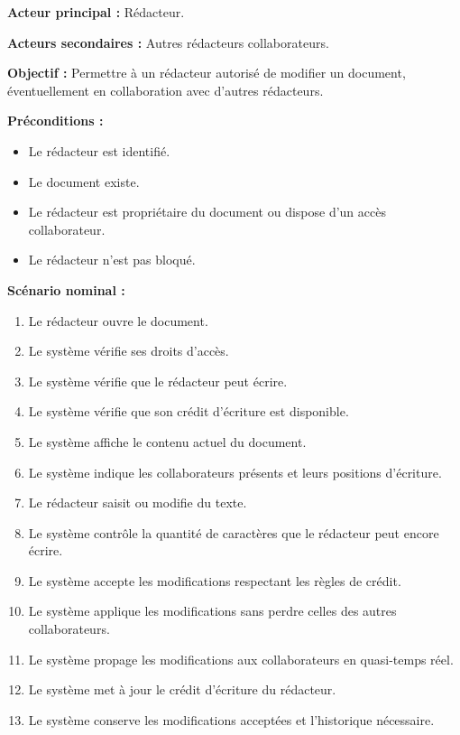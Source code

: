 \begin{description}[leftmargin=0pt, style=nextline, font=\normalfont\bfseries\color{violetprincipal}]
    \item[UC04 --- Modifier un document]

    \textbf{Acteur principal :} Rédacteur.

    \textbf{Acteurs secondaires :} Autres rédacteurs collaborateurs.

    \textbf{Objectif :} Permettre à un rédacteur autorisé de modifier un document, éventuellement en collaboration avec d'autres rédacteurs.

    \textbf{Préconditions :}
    \begin{itemize}
        \item Le rédacteur est identifié.
        \item Le document existe.
        \item Le rédacteur est propriétaire du document ou dispose d'un accès collaborateur.
        \item Le rédacteur n'est pas bloqué.
    \end{itemize}

    \textbf{Scénario nominal :}
    \begin{enumerate}
        \item Le rédacteur ouvre le document.
        \item Le système vérifie ses droits d'accès.
        \item Le système vérifie que le rédacteur peut écrire.
        \item Le système vérifie que son crédit d'écriture est disponible.
        \item Le système affiche le contenu actuel du document.
        \item Le système indique les collaborateurs présents et leurs positions d'écriture.
        \item Le rédacteur saisit ou modifie du texte.
        \item Le système contrôle la quantité de caractères que le rédacteur peut encore écrire.
        \item Le système accepte les modifications respectant les règles de crédit.
        \item Le système applique les modifications sans perdre celles des autres collaborateurs.
        \item Le système propage les modifications aux collaborateurs en quasi-temps réel.
        \item Le système met à jour le crédit d'écriture du rédacteur.
        \item Le système conserve les modifications acceptées et l'historique nécessaire.
    \end{enumerate}


\end{description}
